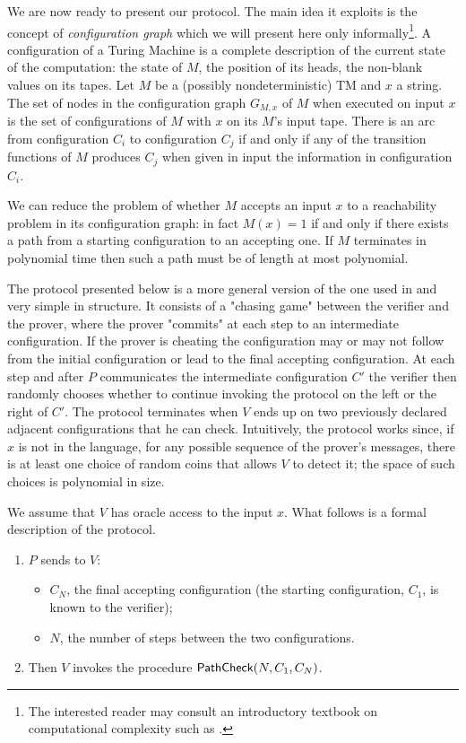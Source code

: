 \label{sec:protocol}
We are now ready to present our protocol. The main idea it exploits is the concept of \emph{configuration graph} which we will present here only informally\footnote{The interested reader may consult an introductory textbook on computational complexity such as \cite{arora2009computational}.}. A configuration of a Turing Machine is a complete description of the current state of the computation: the state of $M$, the position of its heads, the non-blank values on its tapes.  Let $M$ be a (possibly nondeterministic) TM and $x$ a string.
The set of nodes in the configuration graph $G_{M,x}$  of $M$ when executed on input $x$ is the set of configurations of $M$ with $x$ on its $M$'s input tape. There is an arc from configuration $C_i$ to configuration $C_j$ if and only if any of the transition functions of $M$ produces $C_j$ when given in input the information in configuration $C_i$.

We can reduce the problem of whether $M$ accepts an input $x$ to a reachability problem in its configuration graph: in fact $M(x) = 1$ if and only if there exists a path from a starting configuration to an accepting one. If $M$ terminates in polynomial time then such a path must be of length at most polynomial.

The protocol presented below is a more general version of the one used in \cite{cg15} and very simple in structure. It consists of a "chasing game" between the verifier and the prover, where the prover "commits" at each step to an intermediate configuration. If the prover is cheating the configuration may or may not follow from the initial configuration or lead to the final accepting configuration. At each step and after $P$ communicates the intermediate configuration $C'$ the verifier then randomly chooses whether to continue invoking the protocol on the left or the right of $C'$. The protocol terminates when $V$ ends up on two previously declared adjacent configurations that he can check.  Intuitively, the protocol works since, if $x$ is not in the language, for any possible sequence of the prover's messages, there is at least one choice of random coins that allows $V$ to detect it; the space of such choices is polynomial in size.

We assume that $V$ has oracle access to the input $x$.
\noindent What follows is a formal description of the protocol.
\begin{framed}
\begin{enumerate}
    \item $P$ sends to $V$:
    \begin{itemize}
    \item $C_{N}$, the final accepting configuration (the starting configuration, $C_1$, is known to the verifier);
    \item $N$, the number of steps between the two configurations. %
    \end{itemize}
    \item Then $V$ invokes the procedure $\mathsf{PathCheck}(N, C_{1}, C_{N})$.
\end{enumerate}
\end{framed}

